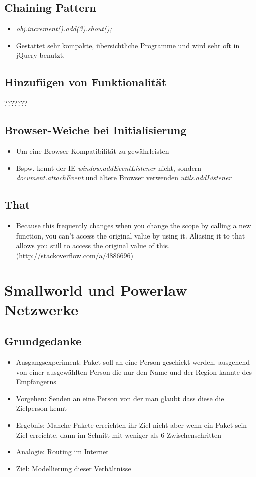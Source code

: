 \documentclass{article} %
\begin{document}
		\subsection{Chaining Pattern}
		\begin{itemize}
			\item \textit{obj.increment().add(3).shout();}
			\item Gestattet sehr kompakte, übersichtliche Programme und wird sehr oft in jQuery benutzt.
		\end{itemize}
		\subsection{Hinzufügen von Funktionalität}
		???????
		\subsection{Browser-Weiche bei Initialisierung}
		\begin{itemize}
			\item Um eine Browser-Kompatibilität zu gewährleisten
			\item Bspw. kennt der IE \textit{window.addEventListener} nicht, sondern \textit{document.attachEvent} und ältere Browser verwenden \textit{utils.addListener}
		\end{itemize}
		\subsection{That}
		\begin{itemize}
			\item Because this frequently changes when you change the scope by calling a new function, you can't access the original value by using it. Aliasing it to that allows you still to access the original value of this. (\url{http://stackoverflow.com/a/4886696})
		\end{itemize}
	
	
	
	\section{Smallworld und Powerlaw Netzwerke}
	\subsection{Grundgedanke}
	\begin{itemize}
		\item Ausgangsexperiment: Paket soll an eine Person geschickt werden, ausgehend von einer ausgewählten Person die nur den Name und der Region kannte des Empfängerns
		\item Vorgehen: Senden an eine Person von der man glaubt dass diese die Zielperson kennt
		\item Ergebnis: Manche Pakete erreichten ihr Ziel nicht aber wenn ein Paket sein Ziel erreichte,
		dann im Schnitt mit weniger als 6 Zwischenschritten
		\item Analogie: Routing im Internet
		\item Ziel: Modellierung dieser Verhältnisse
	\end{itemize}
\end{document}
